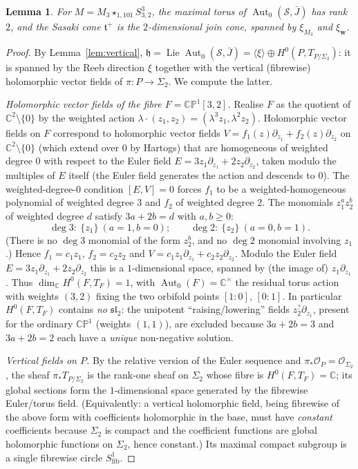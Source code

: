 \documentclass{amsart}
\newtheorem{lemma}{Lemma}
\theoremstyle{definition}
\DeclareMathOperator{\Aut}{Aut}
\DeclareMathOperator{\Lie}{Lie}
\begin{document}
\begin{lemma}\label{lem:cone}
For $M=M_3\star_{1,101}S^3_{3,2}$, the maximal torus of $\Aut_0(\mathcal S,\bar
J)$ has rank $2$, and the Sasaki cone $\mathfrak t^+$ is the $2$-dimensional
join cone, spanned by $\xi_{M_3}$ and $\xi_{\mathbf w}$.
\end{lemma}

\begin{proof}
By Lemma~\ref{lem:vertical}, $\mathfrak h=\Lie\Aut_0(\mathcal S,\bar J)
=\langle\xi\rangle\oplus H^0(P,T_{P/\Sigma_2})$: it is spanned by the Reeb
direction $\xi$ together with the vertical (fibrewise) holomorphic vector fields
of $\pi\colon P\to\Sigma_2$. We compute the latter.

\emph{Holomorphic vector fields of the fibre $F=\mathbb{CP}^1[3,2]$.} Realise
$F$ as the quotient of $\mathbb C^2\setminus\{0\}$ by the weighted action
$\lambda\cdot(z_1,z_2)=(\lambda^{3}z_1,\lambda^{2}z_2)$. Holomorphic vector
fields on $F$ correspond to holomorphic vector fields $V=f_1(z)\partial_{z_1}+
f_2(z)\partial_{z_2}$ on $\mathbb C^2\setminus\{0\}$ (which extend over $0$ by
Hartogs) that are homogeneous of weighted degree $0$ with respect to the Euler
field $E=3z_1\partial_{z_1}+2z_2\partial_{z_2}$, taken modulo the multiples of
$E$ itself (the Euler field generates the action and descends to $0$). The
weighted-degree-$0$ condition $[E,V]=0$ forces $f_1$ to be a weighted-homogeneous
polynomial of weighted degree $3$ and $f_2$ of weighted degree $2$. The monomials
$z_1^{a}z_2^{b}$ of weighted degree $d$ satisfy $3a+2b=d$ with $a,b\ge0$:
\[
  \deg 3:\ \{z_1\}\ (a{=}1,b{=}0);\qquad
  \deg 2:\ \{z_2\}\ (a{=}0,b{=}1).
\]
(There is no $\deg 3$ monomial of the form $z_2^{b}$, and no $\deg 2$ monomial
involving $z_1$.) Hence $f_1=c_1 z_1$, $f_2=c_2 z_2$ and
$V=c_1 z_1\partial_{z_1}+c_2 z_2\partial_{z_2}$. Modulo the Euler field
$E=3z_1\partial_{z_1}+2z_2\partial_{z_2}$ this is a $1$-dimensional space,
spanned by (the image of) $z_1\partial_{z_1}$. Thus
$\dim_{\mathbb C}H^0(F,T_F)=1$, with $\Aut_0(F)=\mathbb C^\times$ the residual
torus action with weights $(3,2)$ fixing the two orbifold points $[1{:}0]$,
$[0{:}1]$. In particular $H^0(F,T_F)$ contains \emph{no} $\mathfrak{sl}_2$: the
unipotent ``raising/lowering'' fields $z_2^{?}\partial_{z_1}$, present for the
ordinary $\mathbb{CP}^1$ (weights $(1,1)$), are excluded because $3a+2b=3$ and
$3a+2b=2$ each have a \emph{unique} non-negative solution.

\emph{Vertical fields on $P$.} By the relative version of the Euler sequence and
$\pi_*\mathcal O_P=\mathcal O_{\Sigma_2}$, the sheaf $\pi_*T_{P/\Sigma_2}$ is
the rank-one sheaf on $\Sigma_2$ whose fibre is $H^0(F,T_F)=\mathbb C$; its
global sections form the $1$-dimensional space generated by the fibrewise
Euler/torus field. (Equivalently: a vertical holomorphic field, being fibrewise
of the above form with coefficients holomorphic in the base, must have
\emph{constant} coefficients because $\Sigma_2$ is compact and the coefficient
functions are global holomorphic functions on $\Sigma_2$, hence constant.) Its
maximal compact subgroup is a single fibrewise circle $S^1_{\mathrm{fib}}$.


\end{proof}
\end{document}
